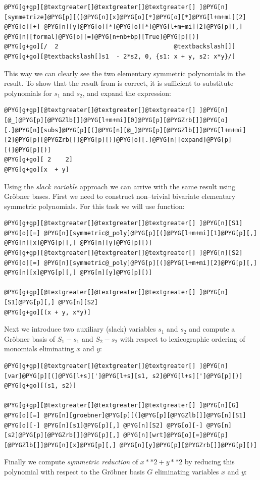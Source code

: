 \begin{Verbatim}[commandchars=@\[\]]
@PYG[g+gp][@textgreater[]@textgreater[]@textgreater[] ]@PYG[n][symmetrize]@PYG[p][(]@PYG[n][x]@PYG[o][*]@PYG[o][*]@PYG[l+m+mi][2] @PYG[o][+] @PYG[n][y]@PYG[o][*]@PYG[o][*]@PYG[l+m+mi][2]@PYG[p][,] @PYG[n][formal]@PYG[o][=]@PYG[n+nb+bp][True]@PYG[p][)]
@PYG[g+go][/  2                                @textbackslash[]]
@PYG[g+go][@textbackslash[]s1  - 2*s2, 0, {s1: x + y, s2: x*y}/]
\end{Verbatim}
\noindent
This way we can clearly see the two elementary symmetric polynomials in the result. To show that the
result from  is correct, it is sufficient to substitute polynomials for $s_1$ and
$s_2$, and expand the expression:

\begin{Verbatim}[commandchars=@\[\]]
@PYG[g+gp][@textgreater[]@textgreater[]@textgreater[] ]@PYG[n][@_]@PYG[p][@PYGZlb[]]@PYG[l+m+mi][0]@PYG[p][@PYGZrb[]]@PYG[o][.]@PYG[n][subs]@PYG[p][(]@PYG[n][@_]@PYG[p][@PYGZlb[]]@PYG[l+m+mi][2]@PYG[p][@PYGZrb[]]@PYG[p][)]@PYG[o][.]@PYG[n][expand]@PYG[p][(]@PYG[p][)]
@PYG[g+go][ 2    2]
@PYG[g+go][x  + y]
\end{Verbatim}
\noindent
Using the \emph{slack variable} approach we can arrive with the same result using Gröbner bases. First
we need to construct non--trivial bivariate elementary symmetric polynomials. For this task we will
use  function:

\begin{Verbatim}[commandchars=@\[\]]
@PYG[g+gp][@textgreater[]@textgreater[]@textgreater[] ]@PYG[n][S1] @PYG[o][=] @PYG[n][symmetric@_poly]@PYG[p][(]@PYG[l+m+mi][1]@PYG[p][,] @PYG[n][x]@PYG[p][,] @PYG[n][y]@PYG[p][)]
@PYG[g+gp][@textgreater[]@textgreater[]@textgreater[] ]@PYG[n][S2] @PYG[o][=] @PYG[n][symmetric@_poly]@PYG[p][(]@PYG[l+m+mi][2]@PYG[p][,] @PYG[n][x]@PYG[p][,] @PYG[n][y]@PYG[p][)]

@PYG[g+gp][@textgreater[]@textgreater[]@textgreater[] ]@PYG[n][S1]@PYG[p][,] @PYG[n][S2]
@PYG[g+go][(x + y, x*y)]
\end{Verbatim}
\noindent
Next we introduce two auxiliary (slack) variables $s_1$ and $s_2$ and compute a Gröbner basis of
$S_1 - s_1$ and $S_2 - s_2$ with respect to lexicographic ordering of monomials eliminating $x$ and $y$:

\begin{Verbatim}[commandchars=@\[\]]
@PYG[g+gp][@textgreater[]@textgreater[]@textgreater[] ]@PYG[n][var]@PYG[p][(]@PYG[l+s][']@PYG[l+s][s1, s2]@PYG[l+s][']@PYG[p][)]
@PYG[g+go][(s1, s2)]

@PYG[g+gp][@textgreater[]@textgreater[]@textgreater[] ]@PYG[n][G] @PYG[o][=] @PYG[n][groebner]@PYG[p][(]@PYG[p][@PYGZlb[]]@PYG[n][S1] @PYG[o][-] @PYG[n][s1]@PYG[p][,] @PYG[n][S2] @PYG[o][-] @PYG[n][s2]@PYG[p][@PYGZrb[]]@PYG[p][,] @PYG[n][wrt]@PYG[o][=]@PYG[p][@PYGZlb[]]@PYG[n][x]@PYG[p][,] @PYG[n][y]@PYG[p][@PYGZrb[]]@PYG[p][)]
\end{Verbatim}
\noindent
Finally we compute \emph{symmetric reduction} of $x**2 + y**2$ by reducing this polynomial with respect to the
Gröbner basis $G$ eliminating variables $x$ and $y$:

